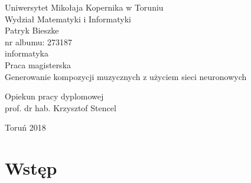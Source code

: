 \documentclass[12pt,a4paper,twoside]{mwart}
\begin{document}
\begin{titlepage}
	\begin{center}
		\large Uniwersytet Mikołaja Kopernika w Toruniu\\
		\large Wydział Matematyki i Informatyki\\
		\vspace{3cm} 
		\large Patryk Bieszke\\
			nr albumu: 273187\\
			informatyka\\
		\vspace{2cm}
		Praca magisterska\\
	
		\vspace{3cm} 
		\huge Generowanie kompozycji muzycznych z użyciem sieci neuronowych\\
	\end{center}
	\hfill
	\begin{minipage}{6cm}
		\vspace{3cm}
		Opiekun pracy dyplomowej\\
		prof. dr hab. Krzysztof Stencel
	\end{minipage}
	\vspace{4cm}
	\begin{center}
		Toruń 2018\\
	\end{center}
\end{titlepage}



\clearpage
\thispagestyle{empty}
\mbox{}

\tableofcontents 
{}
\clearpage

\setcounter{secnumdepth}{0}
\section{Wstęp}
\label{sec:wstep}

\newpage
\end{document}
